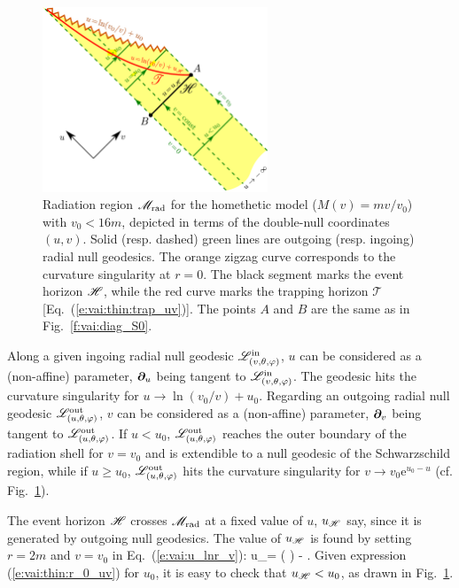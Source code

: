 \begin{figure}
\centerline{\includegraphics[width=0.6\textwidth]{vai_thin_double_null.pdf}}
\caption[]{\label{f:vai:thin_double_null} \footnotesize
Radiation region $\mathscr{M}_{\rm rad}$ for the homethetic model ($M(v) = m v/v_0$) with $v_0 < 16m$,
depicted in terms of the double-null coordinates
$(u, v)$. Solid (resp. dashed) green lines are outgoing (resp. ingoing)
radial null geodesics. The orange zigzag curve corresponds to the curvature
singularity at $r=0$.
The black segment marks the event horizon $\mathscr{H}$, while the red curve marks the trapping horizon
$\mathscr{T}$ [Eq.~(\ref{e:vai:thin:trap_uv})].
The points $A$ and $B$ are the same as in Fig.~\ref{f:vai:diag_S0}.
}
\end{figure}



Along a given ingoing radial null geodesic $\mathscr{L}^{\rm in}_{(v,\theta,\varphi)}$,
$u$ can be considered as a (non-affine) parameter, $\bm{\partial}_u$
being tangent to $\mathscr{L}^{\rm in}_{(v,\theta,\varphi)}$. The geodesic hits the curvature
singularity for $u \to \ln(v_0/v) + u_0$.
Regarding an outgoing radial null geodesic $\mathscr{L}^{\rm out}_{(u,\theta,\varphi)}$,
$v$ can be considered as a (non-affine) parameter, $\bm{\partial}_v$
being tangent to $\mathscr{L}^{\rm out}_{(u,\theta,\varphi)}$. If $u < u_0$,
$\mathscr{L}^{\rm out}_{(u,\theta,\varphi)}$ reaches the outer boundary of the radiation
shell for $v=v_0$ and is extendible to a null geodesic of the Schwarzschild
region, while if $u \geq u_0$, $\mathscr{L}^{\rm out}_{(u,\theta,\varphi)}$ hits the
curvature singularity for $v \to v_0 \mathrm{e}^{u_0 - u}$
(cf. Fig.~\ref{f:vai:thin_double_null}).

The event horizon $\mathscr{H}$ crosses $\mathscr{M}_{\rm rad}$ at a fixed value of $u$, $u_{\mathscr{H}}$ say,
since it is generated by outgoing null geodesics. The value of $u_{\mathscr{H}}$ is found
by setting $r=2m$ and $v=v_0$ in Eq.~(\ref{e:vai:u_lnr_v}):
\be \label{e:vai:thin:u_H}
    u_\Hor = \arctan\left( \right)
    -  .
\ee
Given expression
(\ref{e:vai:thin:r_0_uv}) for $u_0$, it is easy to check that $u_{\mathscr{H}} < u_0$,
as drawn in Fig.~\ref{f:vai:thin_double_null}.


